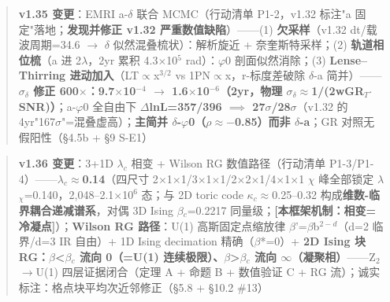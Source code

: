 \documentclass[12pt]{article}
\newcommand{\mtag}[1]{\textbf{[#1]}}
\newcommand{\up}[1]{\ensuremath{^{#1}}}
\newcommand{\down}[1]{\ensuremath{_{#1}}}
\begin{document}
\begin{quote}
\textbf{v1.35 变更}：EMRI a-\ensuremath{\delta} 联合 MCMC（行动清单 P1-2，v1.32 标注"a 固定"落地；\textbf{发现并修正 v1.32 严重数值缺陷}）------(1) \textbf{欠采样}（v1.32 dt/载波周期=34.6 \ensuremath{\to} \ensuremath{\delta} 似然混叠梳状）：解析旋近 + 奈奎斯特采样；(2) \textbf{轨道相位梳}（a 进 2\ensuremath{\lambda}，2yr 累积 4.3\ensuremath{\times}10\up{5} rad）：\ensuremath{\varphi}0 剖面似然消除；(3) \textbf{Lense--Thirring 进动加入}（LT\ensuremath{\propto}x\up{3/2} vs 1PN\ensuremath{\propto}x，r-标度差破除 \ensuremath{\delta}-a 简并）------\textbf{\ensuremath{\sigma}\down{\delta{}} 修正 600\ensuremath{\times}：9.7\ensuremath{\times}10\up{-4} \ensuremath{\to} 1.6\ensuremath{\times}10\up{-6}（2yr，物理 \ensuremath{\sigma}\down{\delta{}}\ensuremath{\approx}1/(2wGR\down{T}\ensuremath{\cdot}SNR)）}；a-\ensuremath{\varphi}0 全自由下 \textbf{\ensuremath{\Delta}lnL=357/396 \ensuremath{\implies} 27\ensuremath{\sigma}/28\ensuremath{\sigma}}（v1.32 的 4yr"167\ensuremath{\sigma}"=混叠虚高）；\textbf{主简并 \ensuremath{\delta}-\ensuremath{\varphi}0（\ensuremath{\rho}\ensuremath{\approx}\ensuremath{-}0.85）而非 \ensuremath{\delta}-a}；GR 对照无假阳性（\S{}4.5b + \S{}9 S-E1）
\end{quote}

\begin{quote}
\textbf{v1.36 变更}：3+1D \ensuremath{\lambda}\down{c} 相变 + Wilson RG 数值路径（行动清单 P1-3/P1-4）------\textbf{\ensuremath{\lambda}\down{c}\ensuremath{\approx}0.14}（四尺寸 2\ensuremath{\times}1\ensuremath{\times}1/3\ensuremath{\times}1\ensuremath{\times}1/2\ensuremath{\times}2\ensuremath{\times}1/4\ensuremath{\times}1\ensuremath{\times}1 \ensuremath{\chi} 峰全部锁定 \ensuremath{\lambda}\down{\chi{}}=0.140，2,048--2.1\ensuremath{\times}10\up{6} 态；与 2D toric code \ensuremath{\kappa}\down{c}\ensuremath{\approx}0.25--0.32 构成\textbf{维数-临界耦合递减谱系}，对偶 3D Ising \ensuremath{\beta}\down{c}=0.2217 同量级；\mtag{本框架机制：相变=冷凝点}）；\textbf{Wilson RG 路径}：U(1) 高斯固定点缩放律 \ensuremath{\beta}'=\ensuremath{\beta}b\up{2-d}（d=2 临界/d=3 IR 自由）+ 1D Ising decimation 精确（\ensuremath{\beta}*=0）+ \textbf{2D Ising 块 RG：\ensuremath{\beta}<\ensuremath{\beta}\down{c} 流向 0（=U(1) 连续极限）、\ensuremath{\beta}>\ensuremath{\beta}\down{c} 流向 \ensuremath{\infty}（凝聚相）}------Z\down{2}\ensuremath{\to}U(1) 四层证据闭合（定理 A + 命题 B + 数值验证 C + RG 流）；诚实标注：格点块平均次近邻修正（\S{}5.8 + \S{}10.2 \#13）
\end{quote}
\end{document}
